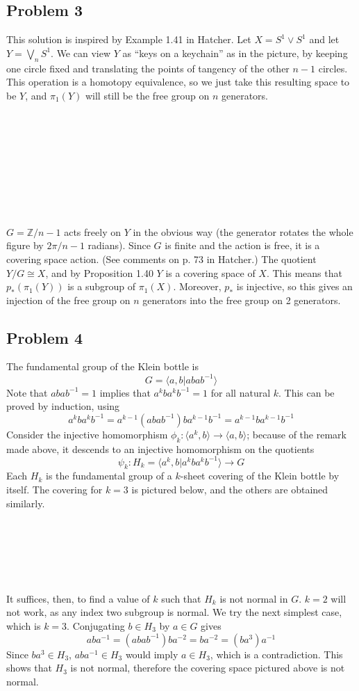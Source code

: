 \documentclass[12 pt]{article}
\newcommand{\Z}{\mathbb{Z}}
\begin{document}
\subsection*{Problem 3}
This solution is inspired by Example 1.41 in Hatcher. Let $X = S^1 \vee S^1$ and let $Y = \bigvee_{n} S^1$. We 
can view $Y$ as ``keys on a keychain'' as in the picture, by keeping one circle fixed and translating the points of
 tangency of the other $n-1$ circles. This operation is a homotopy equivalence, so we just take this resulting 
space to be $Y$, and $\pi_1(Y)$ will still be the free group on $n$ generators.
\\
\\
\\
\\
\\
\\
\\
\\
\\
\\
$G = \Z/n-1$ acts freely on $Y$ in the obvious way (the generator rotates the whole figure by $2\pi/{n-1}$ 
radians). Since $G$ is finite and the action is free, it is a covering space action. (See comments on p. 73 in 
Hatcher.) The quotient $Y/G \cong X$, and by Proposition 1.40 $Y$ is a covering space of $X$. This means 
that $p_*(\pi_1(Y))$ is a subgroup of $\pi_1(X)$. Moreover, $p_*$ is injective, so this gives an injection of 
the free group on $n$ generators into the free group on 2 generators.

\subsection*{Problem 4}
The fundamental group of the Klein bottle is
\[      G =    \langle a,b | abab^{-1} \rangle        \]
Note that $abab^{-1} = 1$ implies that $a^kba^kb^{-1} = 1$ for all natural $k$. This can be proved by
induction, using
\[         a^k b a^k b^{-1} = a^{k-1}( abab^{-1}) ba^{k-1} b^{-1} = a^{k-1}ba^{k-1}b^{-1}          \]
Consider the injective homomorphism $\phi_k : \langle a^k, b \rangle \to \langle a, b \rangle$; because of
the remark made above, it descends to an injective homomorphism on the quotients
\[         \psi_k   :  H_k = \langle a^k, b | a^kba^kb^{-1} \rangle \to G     \]
Each $H_k$ is the fundamental group of a $k$-sheet covering of the Klein bottle by itself. The covering for 
$k=3$ is pictured below, and the others are obtained similarly.
\\
\\
\\
\\
\\
\\
\\
It suffices, then, to find a value of $k$ such that $H_k$ is not normal in $G$. $k=2$ will not work, as any
index two subgroup is normal. We try the next simplest case, which is $k=3$. Conjugating $b \in H_3$ by
$a \in G$ gives
\[       aba^{-1} = (abab^{-1}) b a^{-2} = b a^{-2}  = (ba^{3}) a^{-1}  \]
Since $ba^3 \in H_3$, $aba^{-1} \in H_3$ would imply $a\in H_3$, which is a contradiction. This shows
that $H_3$ is not normal, therefore the covering space pictured above is not normal.
\end{document}
